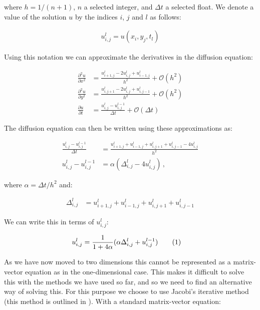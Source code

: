 \documentclass[reprint,english,notitlepage]{revtex4-1}  %
\newcommand\numberthis{\addtocounter{equation}{1}\tag{\theequation}}
\begin{document}
where $h = 1/(n+1)$, $n$ a selected integer, and $\Delta t$ a selected float. We denote a value of the solution $u$ by the indices $i$, $j$ and $l$ as follows:

\begin{align*}
u_{i,j}^l = u(x_i,y_j,t_l)
\end{align*}

Using this notation we can approximate the derivatives in the diffusion equation:

\begin{align*}
\frac{\partial^2 u}{\partial x^2} &= \frac{u_{i+1,j}^l - 2u_{i,j}^l + u_{i-1,j}^l}{h^2} + \mathcal{O}(h^2) \\
\frac{\partial^2 u}{\partial y^2} &= \frac{u_{i,j+1}^l - 2u_{i,j}^l + u_{i,j-1}^l}{h^2} + \mathcal{O}(h^2)\\
\frac{\partial u}{\partial t} &= \frac{u_{i,j}^l - u_{i,j}^{l-1} }{\Delta t} + \mathcal{O}(\Delta t)
\end{align*}

The diffusion equation can then be written using these approximations as:

\begin{align*}
\frac{u_{i,j}^l - u_{i,j}^{l-1} }{\Delta t}  &= \frac{u_{i+1,j}^l + u_{i-1,j}^l + u_{i,j+1}^l + u_{i,j-1}^l - 4u_{i,j}^l}{h^2} \\
u_{i,j}^l - u_{i,j}^{l-1} &= \alpha(\Delta_{i,j}^l - 4u_{i,j}^l) \, , 
\end{align*}

where $\alpha = \Delta t /h^2$ and:

\begin{align*}
\Delta_{i,j}^l &= u_{i+1,j}^l + u_{i-1,j}^l + u_{i,j+1}^l + u_{i,j-1}^l
\end{align*}

We can write this in terms of $u_{i,j}^l$:

\begin{align*}
u_{i,j}^l &= \frac{1}{1 + 4\alpha} (\alpha \Delta_{i,j}^l + u_{i,j}^{l-1} ) \numberthis \label{eq:2D_diff_eq_numerical_solution}
\end{align*}

As we have now moved to two dimensions this cannot be represented as a matrix-vector equation as in the one-dimensional case. This makes it difficult to solve this with the methods we have used so far, and so we need to find an alternative way of solving this. For this purpose we choose to use Jacobi's iterative method (this method is outlined in \cite[p~.189-190]{Hjorth-Jensen2015}). With a standard matrix-vector equation:
\end{document}
